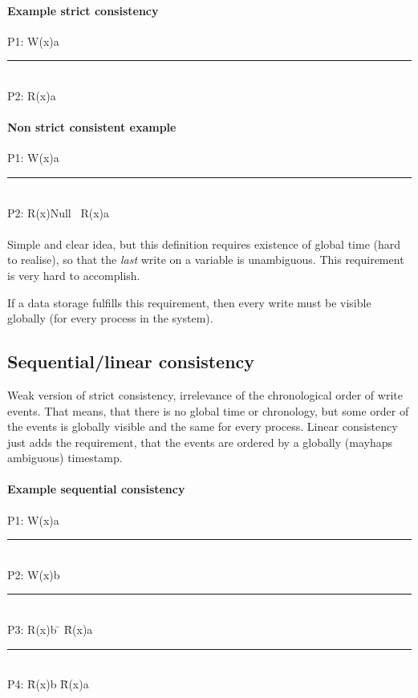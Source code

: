 \paragraph{Example strict consistency}
\begin{tabbing}
P1: W(x)a \= \\
\rule{0.3\textwidth}{0.4pt} \\
P2: \> R(x)a
\end{tabbing}
\paragraph{Non strict consistent example}
\begin{tabbing}
P1: W(x)a \= \\
\rule{0.3\textwidth}{0.4pt} \\
P2: \> R(x)Null \ R(x)a
\end{tabbing}

\paragraph{}
Simple and clear idea, but this definition requires existence of global time (hard to realise), so that the \emph{last} write on a variable is unambiguous. This requirement is very hard to accomplish.

If a data storage fulfills this requirement, then every write must be visible globally (for every process in the system).

\subsection{Sequential/linear consistency}
Weak version of strict consistency, irrelevance of the chronological order of write events.
That means, that there is no global time or chronology, but some order of the events is globally visible and the same for every process.
Linear consistency just adds the requirement, that the events are ordered by a globally (mayhaps ambiguous) timestamp.
\paragraph{Example sequential consistency}
\begin{tabbing}
P1: W(x)a \= \\
\rule{0.4\textwidth}{0.4pt} \\
P2: \> W(x)b \= \\
\rule{0.4\textwidth}{0.4pt} \\
P3: \> \> R(x)b \= \hspace{32pt} \= R(x)a \\
\rule{0.4\textwidth}{0.4pt} \\
P4: \> \> \> \= R(x)b \hspace{5pt} \= R(x)a \\
\end{tabbing}

